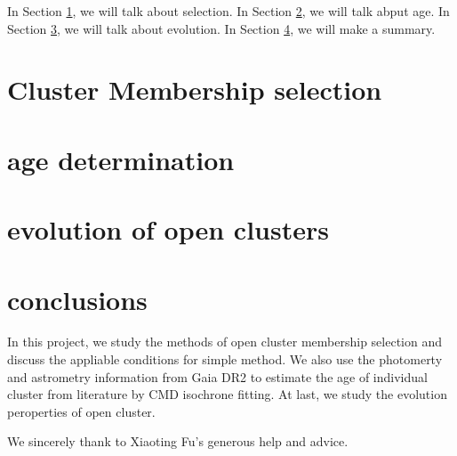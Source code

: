 \documentclass[modern]{aastex63}
\begin{document}
In Section \ref{selection}, we will talk about selection. In Section \ref{age}, we will talk abput age. In Section \ref{evolution}, we will talk about evolution. In Section \ref{con}, we will make a summary.

\bigskip
\bigskip
\section{Cluster Membership selection}\label{selection}






\bigskip
\bigskip
\section{age determination}\label{age}




\bigskip
\bigskip
\section{evolution of open clusters}\label{evolution}




\bigskip
\bigskip
\section{conclusions}\label{con}
In this project, we study the methods of open cluster membership selection and discuss the appliable conditions for simple method. We also use the photomerty and astrometry information from Gaia DR2 to estimate the age of individual cluster from literature by CMD isochrone fitting. At last, we study the evolution peroperties of open cluster.


\acknowledgments
We sincerely thank to Xiaoting Fu's generous help and advice. 

\newpage
{}

\end{document}
